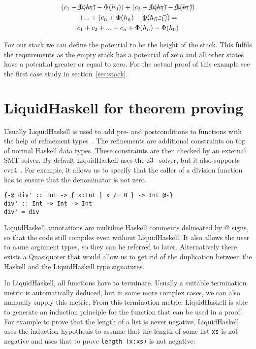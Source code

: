 \documentclass[sigplan,screen]{acmart}
\begin{document}
\begin{gather}
\nonumber (c_1 + \cancel{\Phi(h_1)} - \Phi(h_0)) + (c_2 + \cancel{\Phi(h_2)} - \cancel{\Phi(h_1)}) \\
\nonumber    + ... + (c_n + \Phi(h_n) - \cancel{\Phi(h_{n - 1})}) = \\
  c_1 + c_2 + ... + c_n + \Phi(h_n) - \Phi(h_0) \label{eq:sum}
\end{gather}

For our stack we can define the potential to be the height of the stack. This fulfils the requirements as the empty stack has a potential of zero and all other states have a potential greater or equal to zero. For the actual proof of this example see the first case study in section~\ref{sec:stack}.

\section{LiquidHaskell for theorem proving}\label{sec:liquidhaskell}

Usually LiquidHaskell is used to add pre- and postconditions to functions with the help of refinement types~\cite{refinement_types}. The refinements are additional constraints on top of normal Haskell data types. These constraints are then checked by an external SMT solver. By default LiquidHaskell uses the z3~\cite{z3} solver, but it also supports cvc4~\cite{cvc4}. For example, it allows us to specify that the caller of a division function has to ensure that the denominator is not zero.

\begin{lstlisting}
{-@ div' :: Int -> { x:Int | x /= 0 } -> Int @-}
div' :: Int -> Int -> Int
div' = div
\end{lstlisting}

LiquidHaskell annotations are multiline Haskell comments delineated by @ signs, so that the code still compiles even without LiquidHaskell. It also allows the user to name argument types, so they can be referred to later. Alternatively there exists a Quasiquoter that would allow us to get rid of the duplication between the Haskell and the LiquidHaskell type signatures.

In LiquidHaskell, all functions have to terminate. Usually a suitable termination metric is automatically deduced, but in some more complex cases, we can also manually supply this metric. From this termination metric, LiquidHaskell is able to generate an induction principle for the function that can be used in a proof. For example to prove that the length of a list is never negative, LiquidHaskell uses the induction hypothesis to assume that the length of some list \texttt{xs} is not negative and uses that to prove \texttt{length (x:xs)} is not negative:
\end{document}
